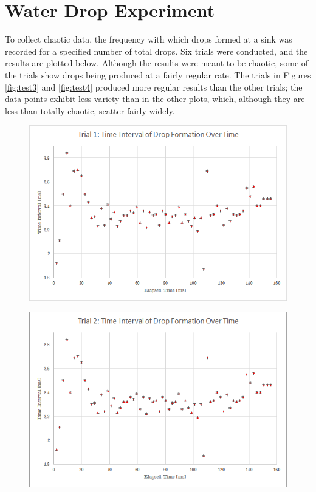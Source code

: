 \documentclass[a4paper]{article}
\begin{document}
\section{Water Drop Experiment}

\qq To collect chaotic data, the frequency with which drops formed at a sink was
recorded for a specified number of total drops. Six trials were conducted, and the
results are plotted below. Although the results were meant to be chaotic,
some of the trials show drops being produced at a fairly regular rate. The
trials in Figures \ref{fig:test3} and \ref{fig:test4} produced more regular
results than the other trials; the data points exhibit less variety than in the
other plots, which, although they are less than totally chaotic, scatter fairly
widely. 

\begin{figure}[H]
\centering
\begin{minipage}{.5\textwidth}
  \centering
  \includegraphics[width=\linewidth]{sink1.png}
  \label{fig:test1}
\end{minipage}%
\begin{minipage}{.5\textwidth}
  \centering
  \includegraphics[width=\linewidth]{sink2.png}
  \label{fig:test2}
\end{minipage}
\end{figure}
\end{document}
